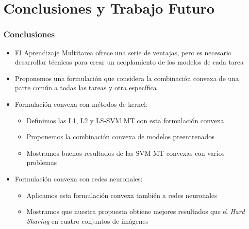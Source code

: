 \documentclass[aspectratio=43,spanish]{beamer}
\begin{document}
\section{Conclusiones y Trabajo Futuro}

\begin{frame}
\frametitle{Conclusiones}
\begin{itemize}
      \item El Aprendizaje Multitarea ofrece una serie de ventajas, pero es necesario desarrollar técnicas para crear un acoplamiento de los modelos de cada tarea
      \item Proponemos una formulación que considera la combinación convexa de una parte común a todas las tareas y otra específica
      \item Formulación convexa con métodos de kernel:
      \begin{itemize}
            \item Definimos las L1, L2 y LS-SVM MT con esta formulación convexa 
            \item Proponemos la combinación convexa de modelos preentrenados
            \item Mostramos buenos resultados de las SVM MT convexas con varios problemas
      \end{itemize}
      \item Formulación convexa con redes neuronales:
      \begin{itemize}
            \item Aplicamos esta formulación convexa también a redes neuronales
            \item Mostramos que nuestra propuesta obtiene mejores resultados que el \emph{Hard Sharing} en cuatro conjuntos de imágenes
      \end{itemize}
            
\end{itemize}
\end{frame}
\end{document}
